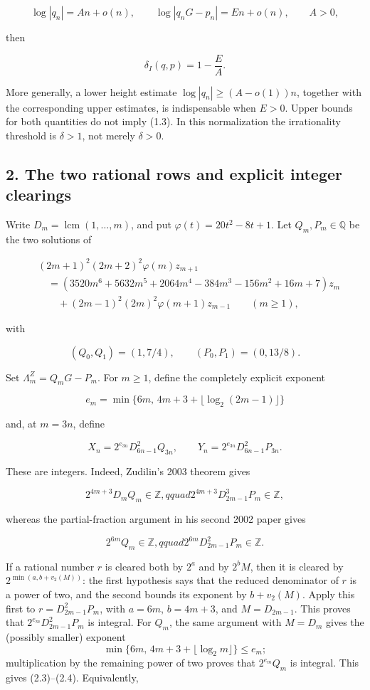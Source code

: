 \documentclass[
  11pt,
]{article}
\begin{document}
\[
 \log|q_n|=An+o(n),\qquad
 \log|q_nG-p_n|=En+o(n),\qquad A>0,
 \tag{1.2}
\]

then

\[
 \delta_I(q,p)=1-\frac EA.
 \tag{1.3}
\]

More generally, a lower height estimate \(\log|q_n|\ge (A-o(1))n\),
together with the corresponding upper estimates, is indispensable when
\(E>0\). Upper bounds for both quantities do not imply (1.3). In this
normalization the irrationality threshold is \(\delta>1\), not merely
\(\delta>0\).

\hypertarget{the-two-rational-rows-and-explicit-integer-clearings}{%
\subsection{2. The two rational rows and explicit integer
clearings}\label{the-two-rational-rows-and-explicit-integer-clearings}}

Write \(D_m=\operatorname{lcm}(1,\ldots,m)\), and put
\(\varphi(t)=20t^2-8t+1\). Let \(Q_m,P_m\in\mathbb Q\) be the two
solutions of

\[
 \begin{split}
 &(2m+1)^2(2m+2)^2\varphi(m)z_{m+1}\\
 &\quad=(3520m^6+5632m^5+2064m^4-384m^3-156m^2+16m+7)z_m\\
 &\qquad +(2m-1)^2(2m)^2\varphi(m+1)z_{m-1}\qquad(m\ge1),
 \end{split}
 \tag{2.1}
\]

with

\[
 (Q_0,Q_1)=(1,7/4),\qquad(P_0,P_1)=(0,13/8).
 \tag{2.2}
\]

Set \(\Lambda_m^Z=Q_mG-P_m\). For \(m\ge1\), define the completely
explicit exponent

\[
 e_m=\min\{6m,\,4m+3+\lfloor\log_2(2m-1)\rfloor\}
 \tag{2.3}
\]

and, at \(m=3n\), define

\[
 X_n=2^{e_{3n}}D_{6n-1}^2Q_{3n},\qquad
 Y_n=2^{e_{3n}}D_{6n-1}^2P_{3n}.
 \tag{2.4}
\]

These are integers. Indeed, Zudilin's 2003 theorem gives

\[
 2^{4m+3}D_mQ_m\in\mathbb Z,qquad
 2^{4m+3}D_{2m-1}^3P_m\in\mathbb Z,
 \tag{2.5}
\]

whereas the partial-fraction argument in his second 2002 paper gives

\[
 2^{6m}Q_m\in\mathbb Z,qquad
 2^{6m}D_{2m-1}^2P_m\in\mathbb Z.
 \tag{2.6}
\]

If a rational number \(r\) is cleared both by \(2^a\) and by \(2^bM\),
then it is cleared by \(2^{\min(a,b+v_2(M))}\): the first hypothesis
says that the reduced denominator of \(r\) is a power of two, and the
second bounds its exponent by \(b+v_2(M)\). Apply this first to
\(r=D_{2m-1}^2P_m\), with \(a=6m\), \(b=4m+3\), and \(M=D_{2m-1}\). This
proves that \(2^{e_m}D_{2m-1}^2P_m\) is integral. For \(Q_m\), the same
argument with \(M=D_m\) gives the (possibly smaller) exponent \[
 \min\{6m,\,4m+3+\lfloor\log_2m\rfloor\}\le e_m;
\] multiplication by the remaining power of two proves that
\(2^{e_m}Q_m\) is integral. This gives (2.3)--(2.4). Equivalently,
\end{document}
